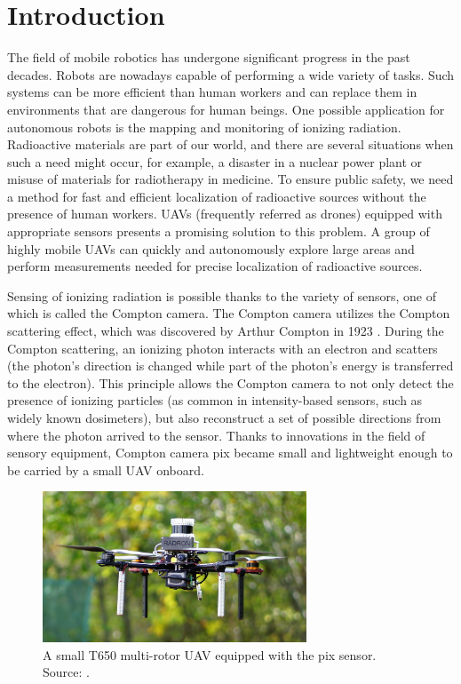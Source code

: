 \chapter{Introduction\label{chap:introduction}}
The field of mobile robotics has undergone significant progress in the past decades.
Robots are nowadays capable of performing a wide variety of tasks. 
Such systems can be more efficient than human workers and can replace them in environments that are dangerous for human beings.
One possible application for autonomous robots is the mapping and monitoring of ionizing radiation. 
Radioactive materials are part of our world, and there are several situations when such a need might occur, for example, a disaster in a nuclear power plant or misuse of materials for radiotherapy in medicine. 
To ensure public safety, we need a method for fast and efficient localization of radioactive sources without the presence of human workers.
\acp{UAV} (frequently referred as drones) equipped with appropriate sensors presents a promising solution to this problem.
A group of highly mobile \ac{UAV}s can quickly and autonomously explore large areas and perform measurements needed for precise localization of radioactive sources.

Sensing of ionizing radiation is possible thanks to the variety of sensors, one of which is called the Compton camera.
The Compton camera utilizes the Compton scattering effect, which was discovered by Arthur Compton in 1923 \cite{compton}.
During the Compton scattering, an ionizing photon interacts with an electron and scatters (the photon's direction is changed while part of the photon's energy is transferred to the electron).
This principle allows the Compton camera to not only detect the presence of ionizing particles (as common in intensity-based sensors, such as widely known dosimeters), but also reconstruct a set of possible directions from where the photon arrived to the sensor.
Thanks to innovations in the field of sensory equipment, Compton camera \ac{pix} became small and lightweight enough to be carried by a small \ac{UAV} onboard.

\begin{figure}[!h]
    \centering
  \includegraphics[width=0.7\textwidth]{./fig/photos/uav.jpg}
    \caption{A small T650 multi-rotor UAV equipped with the \ac{pix} sensor. Source: \cite{baca2021gamma}.}
    \label{fig:uavvv}
\end{figure}

